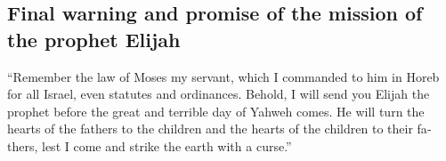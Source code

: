 \begin{paracol}{2}
\begin{otherlanguage}{english}
\hypertarget{final-warning-and-promise-of-the-mission-of-the-prophet-elijah}{%
\subsection{Final warning and promise of the mission of the prophet
Elijah}\label{final-warning-and-promise-of-the-mission-of-the-prophet-elijah}}

 ``Remember the law of Moses my servant, which I commanded
to him in Horeb for all Israel, even statutes and ordinances.
 Behold, I will send you Elijah the prophet before the
great and terrible day of Yahweh comes.  He will turn the
hearts of the fathers to the children and the hearts of the children to
their fathers, lest I come and strike the earth with a curse.''
\end{otherlanguage} \end{paracol}
